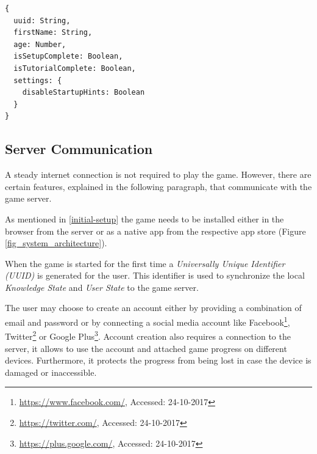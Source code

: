 \begin{lstlisting}[caption={Pseudo TypeScript\protect\footnotemark code for User State}]
{
  uuid: String,
  firstName: String,
  age: Number,
  isSetupComplete: Boolean,
  isTutorialComplete: Boolean,
  settings: {
    disableStartupHints: Boolean
  }
}
\end{lstlisting}

\subsection{Server Communication} \label{server-communication}
A steady internet connection is not required to play the game. However, there are certain features, explained in the following paragraph, that communicate with the game server.

As mentioned in \ref{initial-setup} the game needs to be installed either in the browser from the server or as a native app from the respective app store (Figure \ref{fig_system_architecture}).

When the game is started for the first time a \textit{Universally Unique Identifier (UUID)}\cite{Leach2005AStatus} is generated for the user. This identifier is used to synchronize the local \textit{Knowledge State} and \textit{User State} to the game server.

The user may choose to create an account either by providing a combination of email and password or by connecting a social media account like Facebook\footnote{\url{https://www.facebook.com/}, Accessed: 24-10-2017}, Twitter\footnote{\url{https://twitter.com/}, Accessed: 24-10-2017} or Google Plus\footnote{\url{https://plus.google.com/}, Accessed: 24-10-2017}. Account creation also requires a connection to the server, it allows to use the account and attached game progress on different devices. Furthermore, it protects the progress from being lost in case the device is damaged or inaccessible.

\newpage

